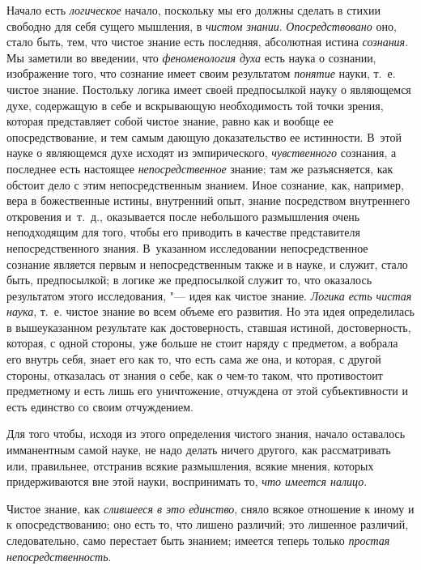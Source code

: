 Начало есть {\em логическое} начало, поскольку мы его
должны сделать в стихии свободно для себя сущего мышления, в
{\em чистом знании}. {\em Опосредствовано} оно, стало быть, тем, что чистое
знание есть последняя, абсолютная истина
{\em сознания}. Мы заметили во введении, что
{\em феноменология духа} есть наука о сознании,
изображение того, что сознание имеет своим результатом
{\em понятие} науки, т.~е. чистое знание. Постольку
логика имеет своей предпосылкой науку о являющемся духе, содержащую в себе
и вскрывающую необходимость той точки зрения, которая представляет собой
чистое знание, равно как и вообще ее опосредствование, и тем самым дающую
доказательство ее истинности. В~этой науке о являющемся духе исходят из
эмпирического, {\em чувственного} сознания, а последнее
есть настоящее {\em непосредственное} знание; там же
разъясняется, как обстоит дело с этим непосредственным знанием. Иное
сознание, как, например, вера в божественные истины, внутренний опыт,
знание посредством внутреннего откровения и~т.~д., оказывается после
небольшого размышления очень неподходящим для того, чтобы его приводить в
качестве представителя непосредственного знания. В~указанном исследовании
непосредственное сознание является первым и непосредственным также и в
науке, и служит, стало быть, предпосылкой; в логике же предпосылкой служит
то, что оказалось результатом этого исследования, "--- идея как чистое знание.
{\em Логика есть чистая наука}, т.~е. чистое знание во
всем объеме его развития. Но эта идея определилась в вышеуказанном
результате как достоверность, ставшая истиной, достоверность, которая, с
одной стороны, уже больше не стоит наряду с предметом, а вобрала его внутрь
себя, знает его как то, что есть сама же она, и которая, с другой стороны,
отказалась от знания о себе, как о чем-то таком, что противостоит
предметному и есть лишь его уничтожение, отчуждена от этой субъективности и
есть единство со своим отчуждением.

Для того чтобы, исходя из этого определения чистого знания, начало
оставалось имманентным самой науке, не надо делать ничего другого, как
рассматривать или, правильнее, отстранив всякие размышления, всякие мнения,
которых придерживаются вне этой науки, воспринимать то,
{\em что имеется налицо}.

Чистое знание, как {\em слившееся в это единство}, сняло
всякое отношение к иному и к опосредствованию; оно есть то, что лишено
различий; это лишенное различий, следовательно, само перестает быть
знанием; имеется теперь только {\em простая
непосредственность}.

